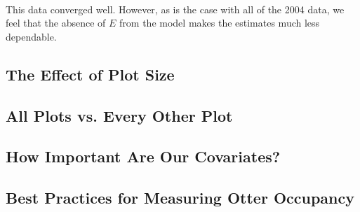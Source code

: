 \documentclass{article}
\begin{document}
    \\

    This data converged well.  However, as is the case with all of the 2004
    data, we feel that the absence of \(E\) from the model makes the estimates
    much less dependable.

    \subsection{The Effect of Plot Size}
    \subsection{All Plots vs. Every Other Plot}
    \subsection{How Important Are Our Covariates?}
    \subsection{Best Practices for Measuring Otter Occupancy}
\end{document}
